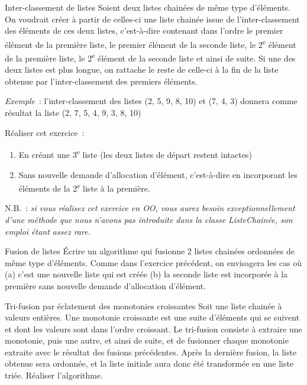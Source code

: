 	\begin{Exercice}{Inter-classement de listes}
		Soient deux listes chainées de même type d'éléments. On voudrait 
		créer à partir de celles-ci une liste chainée issue de
		l'inter-classement des éléments de ces deux listes, c'est-à-dire 
		contenant dans l'ordre le premier élément de la
		première liste, le premier élément de la seconde liste, 
		le 2\textsuperscript{e} élément de la première liste, le
		2\textsuperscript{e} élément de la seconde liste et ainsi de suite. 
		Si une des deux listes est plus longue, on
		rattache le reste de celle-ci à la fin de la liste obtenue par 
		l'inter-classement des premiers éléments.

		\textit{Exemple}~: l'inter-classement des listes (2, 5, 9, 8, 10) et 
		(7, 4, 3) donnera comme résultat la liste
		(2, 7, 5, 4, 9, 3, 8, 10)

		Réaliser cet exercice~:

		\begin{enumerate}
			\item {
				En créant une 3\textsuperscript{e} liste 
				(les deux listes de départ restent intactes)}
			\item {
				Sans nouvelle demande d'allocation d'élément, c'est-à-dire 
				en incorporant les éléments de la 2\textsuperscript{e}
				liste à la première.}
		\end{enumerate}
		
		N.B.~: \textit{si vous réalisez cet exercice en OO, vous aurez besoin 
		exceptionnellement d'une méthode } 
		\textit{ que nous n'avons pas introduite dans la classe ListeChainée, 
		son emploi étant assez rare.}
	\end{Exercice}
	
	\begin{Exercice}{Fusion de listes}
		Écrire un algorithme qui fusionne 2 listes chainées ordonnées 
		de même type d'éléments. Comme dans l'exercice précédent,
		on envisagera les cas où (a) c'est une nouvelle liste qui 
		est créée (b) la seconde liste est incorporée à la première
		sans nouvelle demande d'allocation d'élément.
	\end{Exercice}
	
	\begin{Exercice}{Tri-fusion par éclatement des monotonies croissantes}
		Soit une liste chainée à valeurs entières. Une monotonie croissante 
		est une suite d'éléments qui se suivent et dont les
		valeurs sont dans l'ordre croissant. Le tri-fusion consiste à extraire 
		une monotonie, puis une autre, et ainsi de
		suite, et de fusionner chaque monotonie extraite avec le résultat 
		des fusions précédentes. Après la dernière fusion, la
		liste obtenue sera ordonnée, et la liste initiale aura donc été 
		transformée en une liste triée. Réaliser l'algorithme.
	\end{Exercice}

